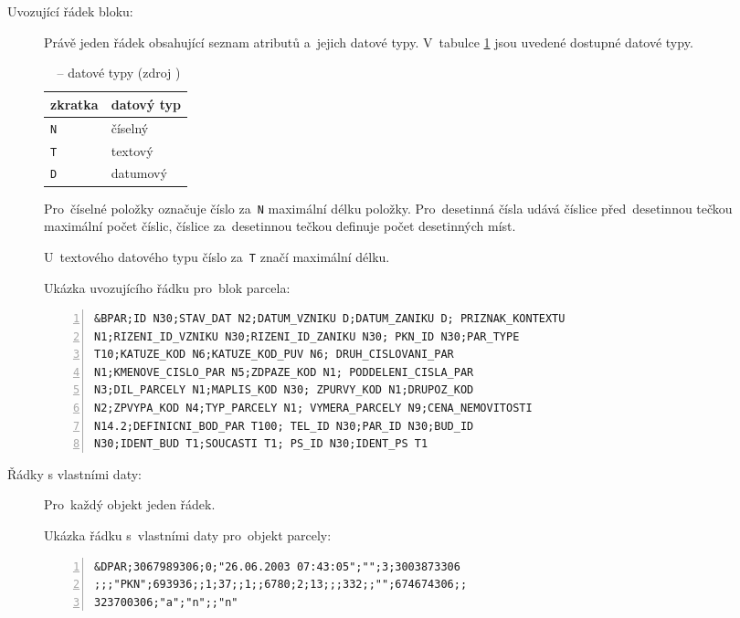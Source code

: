\begin{description}
	\item[Uvozující řádek bloku:] Právě jeden řádek obsahující
seznam atributů a~jejich datové typy. V~tabulce \ref{tab:datove_typy}
jsou uvedené dostupné datové typy.

\begin{table}[H]
    \begin{tabular}{|l|l|} \hline zkratka & datový typ \\ \hline
\hline \texttt{N} & číselný \\ \hline \texttt{T} & textový \\ \hline
\texttt{D} & datumový \\ \hline
    \end{tabular} \centering
    \caption[~– datové typy]{~– datové typy (zdroj
\citep{struktura_vfk})}
    \label{tab:datove_typy}
\end{table}

Pro~číselné položky označuje číslo za~\texttt{N} maximální délku
položky. Pro~desetinná čísla udává číslice před~desetinnou tečkou
maximální počet číslic, číslice za~desetinnou tečkou definuje počet
desetinných míst.

U~textového datového typu číslo za~\texttt{T} značí maximální délku.

Ukázka uvozujícího řádku pro~blok parcela:

	\begin{lstlisting}[basicstyle=\footnotesize\ttfamily,
            backgroundcolor = \color{light-gray}, numbers=left]
&BPAR;ID N30;STAV_DAT N2;DATUM_VZNIKU D;DATUM_ZANIKU D; PRIZNAK_KONTEXTU
N1;RIZENI_ID_VZNIKU N30;RIZENI_ID_ZANIKU N30; PKN_ID N30;PAR_TYPE
T10;KATUZE_KOD N6;KATUZE_KOD_PUV N6; DRUH_CISLOVANI_PAR
N1;KMENOVE_CISLO_PAR N5;ZDPAZE_KOD N1; PODDELENI_CISLA_PAR
N3;DIL_PARCELY N1;MAPLIS_KOD N30; ZPURVY_KOD N1;DRUPOZ_KOD
N2;ZPVYPA_KOD N4;TYP_PARCELY N1; VYMERA_PARCELY N9;CENA_NEMOVITOSTI
N14.2;DEFINICNI_BOD_PAR T100; TEL_ID N30;PAR_ID N30;BUD_ID
N30;IDENT_BUD T1;SOUCASTI T1; PS_ID N30;IDENT_PS T1
	\end{lstlisting}

	\item[Řádky s vlastními daty:] Pro~každý objekt jeden řádek.

Ukázka řádku s~vlastními daty pro~objekt parcely:
	
	\begin{lstlisting}[basicstyle=\footnotesize\ttfamily,
backgroundcolor = \color{light-gray}, numbers=left]
&DPAR;3067989306;0;"26.06.2003 07:43:05";"";3;3003873306
;;;"PKN";693936;;1;37;;1;;6780;2;13;;;332;;"";674674306;;
323700306;"a";"n";;"n"
	\end{lstlisting}
\end{description}

